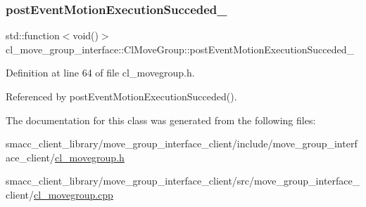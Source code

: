\subsubsection{\texorpdfstring{post\+Event\+Motion\+Execution\+Succeded\+\_\+}{postEventMotionExecutionSucceded\_}}
{\footnotesize\ttfamily std\+::function$<$void()$>$ cl\+\_\+move\+\_\+group\+\_\+interface\+::\+Cl\+Move\+Group\+::post\+Event\+Motion\+Execution\+Succeded\+\_\+\hspace{0.3cm}{\ttfamily [private]}}



Definition at line 64 of file cl\+\_\+movegroup.\+h.



Referenced by post\+Event\+Motion\+Execution\+Succeded().



The documentation for this class was generated from the following files\+:\begin{DoxyCompactItemize}
\item 
smacc\+\_\+client\+\_\+library/move\+\_\+group\+\_\+interface\+\_\+client/include/move\+\_\+group\+\_\+interface\+\_\+client/\hyperlink{cl__movegroup_8h}{cl\+\_\+movegroup.\+h}\item 
smacc\+\_\+client\+\_\+library/move\+\_\+group\+\_\+interface\+\_\+client/src/move\+\_\+group\+\_\+interface\+\_\+client/\hyperlink{cl__movegroup_8cpp}{cl\+\_\+movegroup.\+cpp}\end{DoxyCompactItemize}
